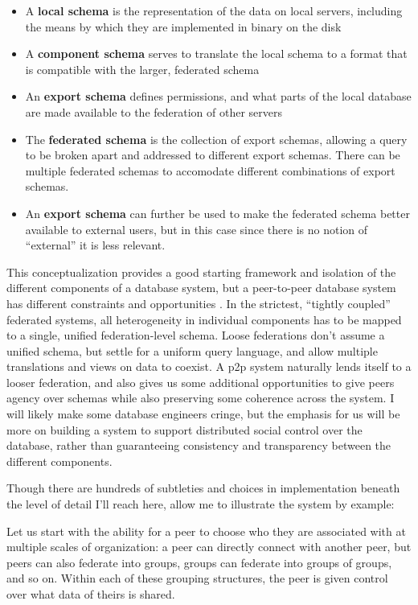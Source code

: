 \documentclass[notoc]{tufte-book}
\begin{document}
\begin{itemize}

\item
  A \textbf{local schema} is the representation of the data on local
  servers, including the means by which they are implemented in binary
  on the disk
\item
  A \textbf{component schema} serves to translate the local schema to a
  format that is compatible with the larger, federated schema
\item
  An \textbf{export schema} defines permissions, and what parts of the
  local database are made available to the federation of other servers
\item
  The \textbf{federated schema} is the collection of export schemas,
  allowing a query to be broken apart and addressed to different export
  schemas. There can be multiple federated schemas to accomodate
  different combinations of export schemas.
\item
  An \textbf{export schema} can further be used to make the federated
  schema better available to external users, but in this case since
  there is no notion of ``external'' it is less relevant.
\end{itemize}

This conceptualization provides a good starting framework and isolation
of the different components of a database system, but a peer-to-peer
database system has different constraints and opportunities \citep{bonifatiDistributedDatabasesPeertopeer2008} . In the strictest,
``tightly coupled'' federated systems, all heterogeneity in individual
components has to be mapped to a single, unified federation-level
schema. Loose federations don't assume a unified schema, but settle for
a uniform query language, and allow multiple translations and views on
data to coexist. A p2p system naturally lends itself to a looser
federation, and also gives us some additional opportunities to give
peers agency over schemas while also preserving some coherence across
the system. I will likely make some database engineers cringe, but the
emphasis for us will be more on building a system to support distributed
social control over the database, rather than guaranteeing consistency
and transparency between the different components.

Though there are hundreds of subtleties and choices in implementation
beneath the level of detail I'll reach here, allow me to illustrate the
system by example:

Let us start with the ability for a peer to choose who they are
associated with at multiple scales of organization: a peer can directly
connect with another peer, but peers can also federate into groups,
groups can federate into groups of groups, and so on. Within each of
these grouping structures, the peer is given control over what data of
theirs is shared.
\end{document}
